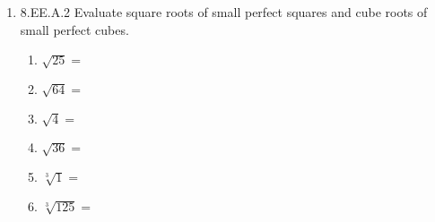 \documentclass[12pt, twoside]{article}
\begin{document}
\begin{enumerate}[itemsep=0.5cm]
\item 8.EE.A.2 Evaluate square roots of small perfect squares and cube roots of small perfect cubes.
    \begin{multicols}{2}
    \begin{enumerate}[itemsep=0.5cm]
        \item $\sqrt{25}=$
        \item $\sqrt{64}=$
        \item $\sqrt{4}=$
        \item $\sqrt{36}=$
        \item $\sqrt[3]{1}=$
        \item $\sqrt[3]{125}=$
    \end{enumerate}
    \end{multicols}

\end{enumerate}
\end{document}
